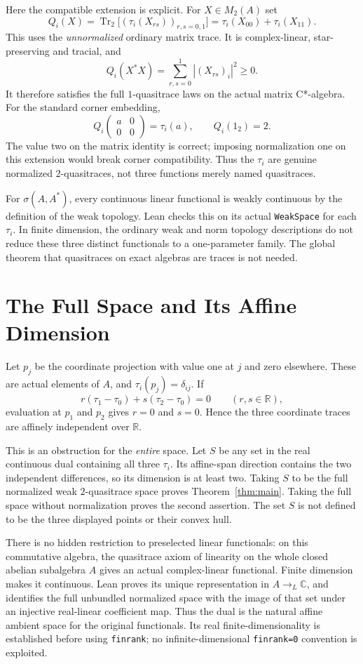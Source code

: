 \documentclass[11pt]{article}
\newcommand{\C}{\mathbb C}
\newcommand{\R}{\mathbb R}
\newcommand{\Tr}{\operatorname{Tr}}
\begin{document}
Here the compatible extension is explicit. For $X\in M_2(A)$ set
\[
 Q_i(X)=\Tr_2\bigl[(\tau_i(X_{rs}))_{r,s=0,1}\bigr]
       =\tau_i(X_{00})+\tau_i(X_{11}).
\]
This uses the \emph{unnormalized} ordinary matrix trace. It is complex-linear,
star-preserving and tracial, and
\[
 Q_i(X^*X)=\sum_{r,s=0}^1 |(X_{rs})_i|^2\geq0.
\]
It therefore satisfies the full $1$-quasitrace laws on the actual matrix
C*-algebra. For the standard corner embedding,
\[
 Q_i\begin{pmatrix}a&0\\0&0\end{pmatrix}=\tau_i(a),
 \qquad Q_i(1_2)=2.
\]
The value two on the matrix identity is correct; imposing normalization one
on this extension would break corner compatibility. Thus the $\tau_i$
are genuine normalized $2$-quasitraces, not three functions merely named
quasitraces.

For $\sigma(A,A^*)$, every continuous linear functional is weakly
continuous by the definition of the weak topology. Lean checks this
on its actual \texttt{WeakSpace} for each $\tau_i$. In finite dimension,
the ordinary weak and norm topology descriptions do not reduce these
three distinct functionals to a one-parameter family. The global theorem
that quasitraces on exact algebras are traces is not needed.

\section{The Full Space and Its Affine Dimension}
Let $p_j$ be the coordinate projection with value one at $j$ and zero
elsewhere. These are actual elements of $A$, and $\tau_i(p_j)=\delta_{ij}$.
If
\[
 r(\tau_1-\tau_0)+s(\tau_2-\tau_0)=0\qquad(r,s\in\R),
\]
evaluation at $p_1$ and $p_2$ gives $r=0$ and $s=0$. Hence the three
coordinate traces are affinely independent over $\R$.

This is an obstruction for the \emph{entire} space. Let $S$ be any set
in the real continuous dual containing all three $\tau_i$. Its affine-span
direction contains the two independent differences, so its dimension is
at least two. Taking $S$ to be the full normalized weak $2$-quasitrace
space proves Theorem~\ref{thm:main}. Taking the full space without
normalization proves the second assertion. The set $S$ is not defined to
be the three displayed points or their convex hull.

There is no hidden restriction to preselected linear functionals: on this
commutative algebra, the quasitrace axiom of linearity on the whole closed
abelian subalgebra $A$ gives an actual complex-linear functional. Finite
dimension makes it continuous. Lean proves its unique representation in
$A\to_L\C$, and identifies the full unbundled normalized space with the
image of that set under an injective real-linear coefficient map. Thus
the dual is the natural affine ambient space for the original functionals.
Its real finite-dimensionality is established before using \texttt{finrank};
no infinite-dimensional \texttt{finrank=0} convention is exploited.
\end{document}

